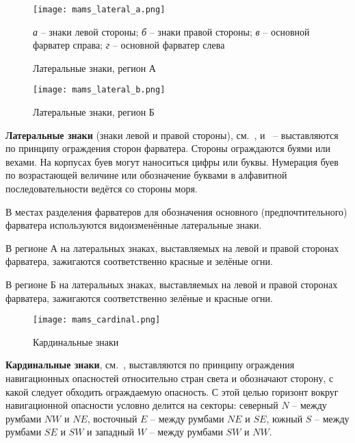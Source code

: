 \begin{figure}[!htb]
  \centering{}
  \texttt{[image: mams\_lateral\_a.png]}
  \caption{Латеральные знаки, регион А}
  {\small \textit{а} \--- знаки левой стороны;
    \textit{б} \--- знаки правой стороны;
    \textit{в} \--- основной фарватер справа;
    \textit{г} \--- основной фарватер слева}
  \label{fig:mams-lateral-a}
\end{figure}

\begin{figure}[!htb]
  \centering{}
  \texttt{[image: mams\_lateral\_b.png]}
  \caption{Латеральные знаки, регион Б}
  \label{fig:mams-lateral-b}
\end{figure}

\textbf{Латеральные знаки} (знаки левой и
правой стороны), см.~, 
и~ \--- выставляются по принципу ограждения
сторон фарватера.  Стороны ограждаются буями или вехами. На корпусах
буев могут наноситься цифры или буквы. Нумерация буев по возрастающей
величине или обозначение буквами в алфавитной последовательности
ведётся со стороны моря.

В местах разделения фарватеров для обозначения основного
(предпочтительного) фарватера используются видоизменённые латеральные
знаки.

В регионе А на латеральных знаках, выставляемых на левой и правой
сторонах фарватера, зажигаются соответственно красные и зелёные огни.

В регионе Б на латеральных знаках, выставляемых на левой и правой
сторонах фарватера, зажигаются соответственно зелёные и красные огни.

\begin{figure}[!htb]
  \centering{}
  \texttt{[image: mams\_cardinal.png]}
  \caption{Кардинальные знаки}
  \label{fig:mams-cardinal}
\end{figure}

\textbf{Кардинальные знаки},
см.~, выставляются по принципу ограждения
навигационных опасностей относительно стран света и обозначают
сторону, с какой следует обходить ограждаемую опасность. С этой целью
горизонт вокруг навигационной опасности условно делится на секторы:
северный $N$ \--- между румбами $NW$ и $NE$, восточный $E$ \--- между румбами
$NE$ и $SE$, южный $S$ \--- между румбами $SE$ и $SW$ и западный $W$ \--- между
румбами $SW$ и $NW$.

